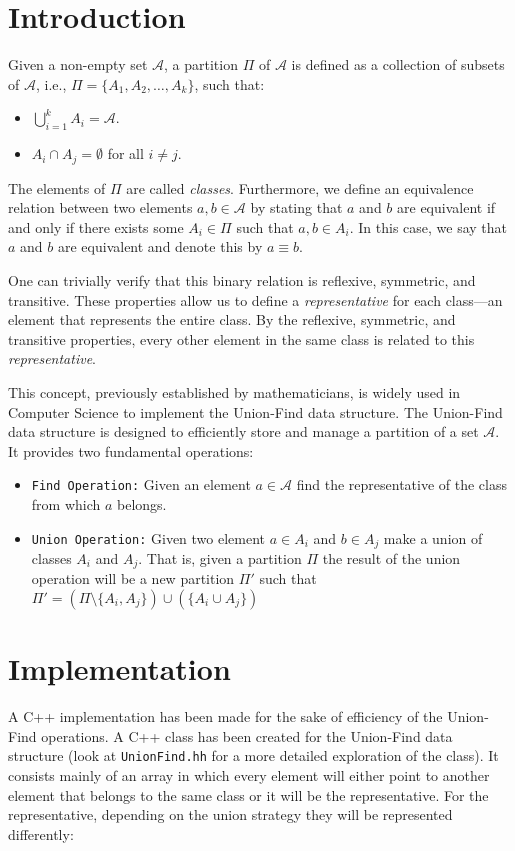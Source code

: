 \section{Introduction}
Given a non-empty set $\mathcal{A}$, a partition $\Pi$ of $\mathcal{A}$ is defined as a collection of subsets of $\mathcal{A}$, i.e., $\Pi = \{A_1, A_2, \ldots, A_k\}$, such that:

\begin{itemize}
    \item $\bigcup\limits_{i = 1}^{k} A_i = \mathcal{A}$.
    \item $A_i \cap A_j = \emptyset$ for all $i \neq j$.
\end{itemize}

The elements of $\Pi$ are called \textit{classes}. Furthermore, we define an equivalence relation between two elements $a, b \in \mathcal{A}$ by stating that $a$ and $b$ are equivalent if and only if there exists some $A_i \in \Pi$ such that $a, b \in A_i$. In this case, we say that $a$ and $b$ are equivalent and denote this by $a \equiv b$.

One can trivially verify that this binary relation is reflexive, symmetric, and transitive. These properties allow us to define a \textit{representative} for each class—an element that represents the entire class. By the reflexive, symmetric, and transitive properties, every other element in the same class is related to this \textit{representative}.

This concept, previously established by mathematicians, is widely used in Computer Science to implement the Union-Find data structure. The Union-Find data structure is designed to efficiently store and manage a partition of a set $\mathcal{A}$. It provides two fundamental operations:

\begin{itemize}
    \item \texttt{Find Operation:} Given an element $a \in \mathcal{A}$ find the representative of the class from which $a$ belongs.
    \item \texttt{Union Operation:} Given two element $a \in A_i$ and $b \in A_j$ make a union of classes $A_i$ and $A_j$. That is, given a partition $\Pi$ the result of the union operation will be a new partition $\Pi'$ such that $\Pi' =  (\Pi \setminus \{A_i,A_j\}) \cup (\{A_i \cup A_j\})$
\end{itemize}

\section{Implementation}
A C++ implementation has been made for the sake of efficiency of the Union-Find operations. A C++ class has been created for the Union-Find data structure (look at \texttt{UnionFind.hh} for a more detailed exploration of the class). It consists mainly of an array in which every element will either point to another element that belongs to the same class or it will be the representative. For the representative, depending on the union strategy they will be represented differently:

